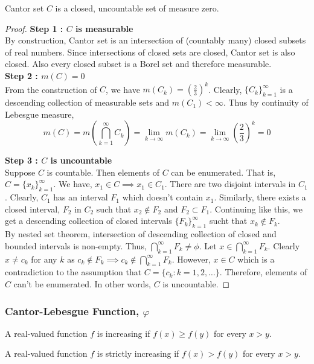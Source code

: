 \begin{theorem}
	Cantor set $C$ is a closed, uncountable set of measure zero.
\end{theorem}
\begin{proof}
	\textbf{Step 1 : $C$ is measurable}\\
	By construction, Cantor set is an intersection of (countably	many) closed subsets of real numbers.
	Since intersections of closed sets are closed, Cantor set is also closed.
	Also every closed subset is a Borel set and therefore measurable.\\

	\textbf{Step 2 : $m(C) = 0$}\\
	From the construction of $C$,
	we have $m(C_k) = \left( \frac{2}{3} \right)^k$.
	Clearly, $\{ C_k \}_{k=1}^\infty$ is a descending collection of measurable sets and $m(C_1) < \infty$.
	Thus by continuity of Lebesgue measure, 
	\[ m(C) = m \left( \bigcap_{k=1}^\infty C_k \right) =  \lim_{k \to \infty} m(C_k) = \lim_{k \to \infty} \left( \frac{2}{3} \right)^k = 0 \]

	\textbf{Step 3 : $C$ is uncountable}\\
	Suppose $C$ is countable.
	Then elements of $C$ can be enumerated.
	That is, $C = \{ x_k \}_{k=1}^\infty$.
	We have, $x_1  \in C \implies x_1 \in C_1$.
	There are two disjoint intervals in $C_1$.
	Clearly, $C_1$ has an interval $F_1$ which doesn't contain $x_1$.
	Similarly, there exists a closed interval, $F_2$ in  $C_2$ such that $x_2 \notin F_2$ and $F_2 \subset F_1$.
	Continuing like this, we get a descending collection of closed intervals $\{ F_k \}_{k=1}^\infty$ sucht that $x_k \notin F_k$.\\

	By nested set theorem, intersection of descending collection of closed and bounded intervals is non-empty.
	Thus, $\displaystyle \bigcap_{k=1}^\infty F_k \ne \phi$.
	Let $x \in \displaystyle \bigcap_{k=1}^\infty F_k$.
	Clearly $x \ne c_k$ for any $k$ as $\displaystyle c_k \notin F_k \implies c_k \notin \bigcap_{k=1}^\infty F_k$.
	However, $x \in C$ which is a contradiction to the assumption that $C = \{ c_k : k = 1,2,\dots \}$.
	Therefore, elements of $C$ can't be enumerated.
	In other words, $C$ is uncountable.
\end{proof}

\subsubsection{Cantor-Lebesgue Function, $\varphi$}
\begin{definition}[increasing]
	A real-valued function $f$ is increasing if $f(x) \ge f(y)$ for every $x > y$.
\end{definition}
\begin{definition}
	A real-valued function $f$ is strictly increasing if $f(x) > f(y)$ for every $x > y$.
\end{definition}

